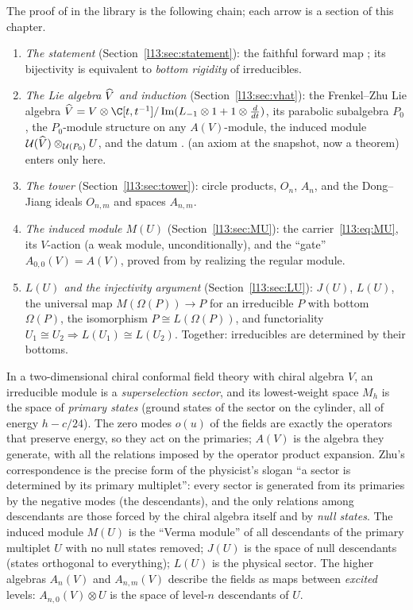 The proof of  in the library is the following chain; each arrow is a section of this chapter.
\begin{enumerate}
\item \emph{The statement} (Section~\ref{l13:sec:statement}): the faithful forward map ; its
  bijectivity is equivalent to \emph{bottom rigidity} of irreducibles.
\item \emph{The Lie algebra $\widehat{V}$ and induction} (Section~\ref{l13:sec:vhat}): the Frenkel--Zhu Lie algebra
  $\lthirteenVh = V\otimes\C[t,t^{-1}]/\operatorname{Im}(L_{-1}\otimes1+1\otimes\tfrac{d}{dt})$, its parabolic
  subalgebra $P_0$, the $P_0$-module structure on any $A(V)$-module, the induced module
  $\mathcal{U}(\widehat{V})\otimes_{\mathcal{U}(P_0)}U$, and the datum .  (an axiom at
  the snapshot, now a theorem) enters only here.
\item \emph{The tower} (Section~\ref{l13:sec:tower}): circle products, $O_n$, $A_n$, and the Dong--Jiang ideals
  $O_{n,m}$ and spaces $A_{n,m}$.
\item \emph{The induced module $M(U)$} (Section~\ref{l13:sec:MU}): the carrier~\eqref{l13:eq:MU}, its $V$-action (a weak
  module, unconditionally), and the ``gate'' $A_{0,0}(V) = A(V)$, proved from  by realizing the regular module.
\item \emph{$L(U)$ and the injectivity argument} (Section~\ref{l13:sec:LU}): $J(U)$, $L(U)$, the universal map
  $M(\Omega(P))\to P$ for an irreducible $P$ with bottom $\Omega(P)$, the isomorphism $P\cong L(\Omega(P))$, and
  functoriality $U_1\cong U_2\Rightarrow L(U_1)\cong L(U_2)$. Together: irreducibles are determined by their bottoms.
\end{enumerate}

\begin{physics}
In a two-dimensional chiral conformal field theory with chiral algebra $V$, an irreducible module is a
\emph{superselection sector}, and its lowest-weight space $M_h$ is the space of \emph{primary states} (ground states of
the sector on the cylinder, all of energy $h-c/24$). The zero modes $o(u)$ of the fields are exactly the operators that
preserve energy, so they act on the primaries; $A(V)$ is the algebra they generate, with all the relations imposed by
the operator product expansion. Zhu's correspondence is the precise form of the physicist's slogan ``a sector is
determined by its primary multiplet'': every sector is generated from its primaries by the negative modes (the
descendants), and the only relations among descendants are those forced by the chiral algebra itself and by
\emph{null states}. The induced module $M(U)$ is the ``Verma module'' of all descendants of the primary multiplet $U$
with no null states removed; $J(U)$ is the space of null descendants (states orthogonal to everything); $L(U)$ is the
physical sector. The higher algebras $A_n(V)$ and $A_{n,m}(V)$ describe the fields as maps between \emph{excited}
levels: $A_{n,0}(V)\otimes U$ is the space of level-$n$ descendants of $U$.
\end{physics}


